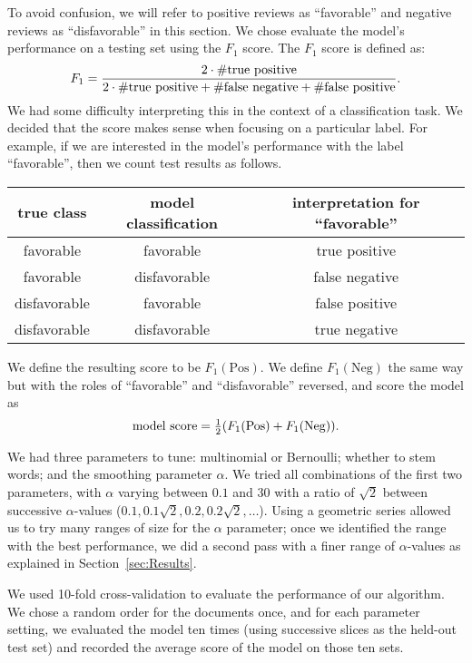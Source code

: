 \documentclass{article}
\newcommand{\PosC}{\mathrm{Pos}}
\newcommand{\NegC}{\mathrm{Neg}}
\begin{document}
To avoid confusion, we will refer to positive reviews as ``favorable'' and negative reviews as ``disfavorable'' in this section.  We chose evaluate the model's performance on a testing set using the \(F_1\) score.  The \(F_1\) score is defined as:
\[
  F_1=
  \frac
      {2\cdot\#\text{true positive}}
      {2\cdot\#\text{true positive}+\#\text{false negative}+\#\text{false positive}}
  \ldotp
\]
We had some difficulty interpreting this in the context of a classification task.
We decided that the score makes sense when focusing on a particular label.
For example, if we are interested in the model's performance with the label ``favorable'', then we count test results as follows.

\begin{tabular}{c|c|c}
  true class & model classification & interpretation for ``favorable'' \\
  \hline
  favorable & favorable & true positive \\
  favorable & disfavorable & false negative \\
  disfavorable & favorable & false positive \\
  disfavorable & disfavorable & true negative \\
\end{tabular}

We define the resulting score to be \(F_1(\PosC)\).
We define \(F_1(\NegC)\) the same way but with the roles of ``favorable'' and ``disfavorable'' reversed, and score the model as
\[\text{model score}=\tfrac12 (F_1(\PosC) + F_1(\NegC)) \ldotp\]

We had three parameters to tune: multinomial or Bernoulli; whether to stem words; and the smoothing parameter \(\alpha\).  We tried all combinations of the first two parameters, with \(\alpha\) varying between \(0.1\) and \(30\) with a ratio of \(\sqrt{2}\) between successive \(\alpha\)-values (\(0.1, 0.1\sqrt{2}, 0.2, 0.2\sqrt{2}, \dotsc\)).  Using a geometric series allowed us to try many ranges of size for the \(\alpha\) parameter; once we identified the range with the best performance, we did a second pass with a finer range of \(\alpha\)-values as explained in Section~\ref{sec:Results}.

We used 10-fold cross-validation to evaluate the performance of our algorithm.  We chose a random order for the documents once, and for each parameter setting, we evaluated the model ten times (using successive slices as the held-out test set) and recorded the average score of the model on those ten sets.
\end{document}
